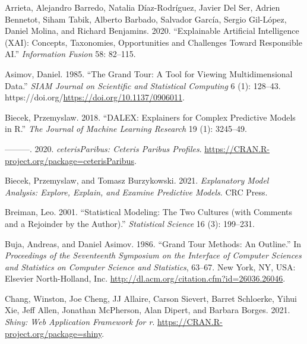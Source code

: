 \documentclass[
]{article}
\newlength{\cslhangindent}
\newlength{\cslentryspacingunit} %
\newenvironment{CSLReferences}[2] %
 {%
  \setlength{\parindent}{0pt}
  \ifodd #1
  \let\oldpar\par
  \def\par{\hangindent=\cslhangindent\oldpar}
  \fi
  \setlength{\parskip}{#2\cslentryspacingunit}
 }%
 {}
\begin{document}
\hypertarget{refs}{}
\begin{CSLReferences}{1}{0}
\leavevmode{}%
Arrieta, Alejandro Barredo, Natalia Díaz-Rodríguez, Javier Del Ser, Adrien Bennetot, Siham Tabik, Alberto Barbado, Salvador García, Sergio Gil-López, Daniel Molina, and Richard Benjamins. 2020. {``Explainable {Artificial} {Intelligence} ({XAI}): {Concepts}, Taxonomies, Opportunities and Challenges Toward Responsible {AI}.''} \emph{Information Fusion} 58: 82--115.

\leavevmode{}%
Asimov, Daniel. 1985. {``The {Grand} {Tour}: A {Tool} for {Viewing} {Multidimensional} {Data}.''} \emph{SIAM Journal on Scientific and Statistical Computing} 6 (1): 128--43. https://doi.org/\url{https://doi.org/10.1137/0906011}.

\leavevmode{}%
Biecek, Przemyslaw. 2018. {``{DALEX}: Explainers for Complex Predictive Models in {R}.''} \emph{The Journal of Machine Learning Research} 19 (1): 3245--49.

\leavevmode{}%
---------. 2020. \emph{{ceterisParibus}: {Ceteris} {Paribus} {Profiles}}. \url{https://CRAN.R-project.org/package=ceterisParibus}.

\leavevmode{}%
Biecek, Przemyslaw, and Tomasz Burzykowski. 2021. \emph{Explanatory {Model} {Analysis}: {Explore}, {Explain}, and {Examine} {Predictive} {Models}}. CRC Press.

\leavevmode{}%
Breiman, Leo. 2001. {``Statistical Modeling: {The} Two Cultures (with Comments and a Rejoinder by the Author).''} \emph{Statistical Science} 16 (3): 199--231.

\leavevmode{}%
Buja, Andreas, and Daniel Asimov. 1986. {``Grand {Tour} {Methods}: {An} {Outline}.''} In \emph{Proceedings of the {Seventeenth} {Symposium} on the {Interface} of {Computer} {Sciences} and {Statistics} on {Computer} {Science} and {Statistics}}, 63--67. New York, NY, USA: Elsevier North-Holland, Inc. \url{http://dl.acm.org/citation.cfm?id=26036.26046}.

\leavevmode{}%
Chang, Winston, Joe Cheng, JJ Allaire, Carson Sievert, Barret Schloerke, Yihui Xie, Jeff Allen, Jonathan McPherson, Alan Dipert, and Barbara Borges. 2021. \emph{Shiny: Web Application Framework for r}. \url{https://CRAN.R-project.org/package=shiny}.


\end{CSLReferences}
\end{document}
